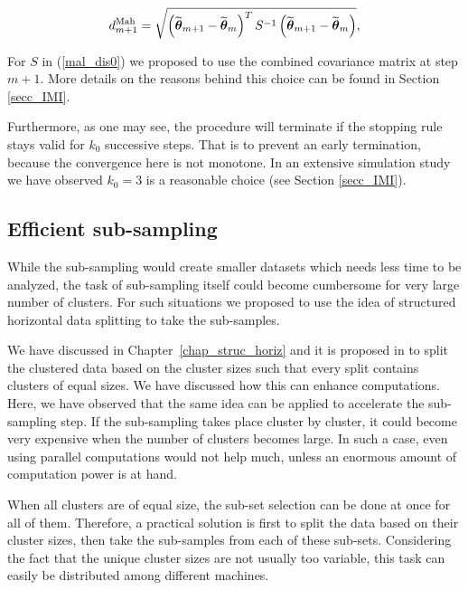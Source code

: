 \documentclass[11pt,a5paper,twoside]{book}
\newcommand{\bftheta}{\mbox{\boldmath $\theta$}}
\begin{document}
\begin{equation}
\label{mal_dis0}
d_{m+1}^{\mathrm{Mah}} = \sqrt{\left(\widetilde{\bftheta}_{m+1}- \widetilde{\bftheta}_{m}\right)^T S^{-1} \left(\widetilde{\bftheta}_{m+1}- \widetilde{\bftheta}_{m}\right)},
\end{equation}

For $S$ in (\ref{mal_dis0}) we proposed to use the combined covariance matrix at step $m+1$. More details on the reasons behind this choice can be found in Section \ref{secc_IMI}.

Furthermore, as one may see, the procedure will terminate if the stopping rule stays valid for $k_0$ successive steps. That is to prevent an early termination, because the convergence here is not monotone. In an extensive simulation study we have observed $k_0=3$ is a reasonable choice (see Section \ref{secc_IMI}).



\subsection{Efficient sub-sampling}

While the sub-sampling would create smaller datasets which needs less time to be analyzed, the task of sub-sampling itself could become cumbersome for very large number of clusters. For such situations we proposed to use the idea of structured horizontal data splitting to take the sub-samples. 

We have discussed in Chapter~\ref{chap_struc_horiz} and it is proposed in \cite{Lisa2016_2,Lisa2016_3} to split the clustered data based on the cluster sizes such that every split contains clusters of equal sizes. We have discussed how this can enhance computations. Here, we have observed that the same idea can be applied to accelerate the sub-sampling step. If the sub-sampling takes place cluster by cluster, it could become very expensive when the number of clusters becomes large. In such a case, even using parallel computations would not help much, unless an enormous amount of computation power is at hand. 

When all clusters are of equal size, the sub-set selection can be done at once for all of them. Therefore, a practical solution is first to split the data based on their cluster sizes, then take the sub-samples from each of these sub-sets. Considering the fact that the unique cluster sizes are not usually too variable, this task can easily be distributed among different machines. 
\end{document}
